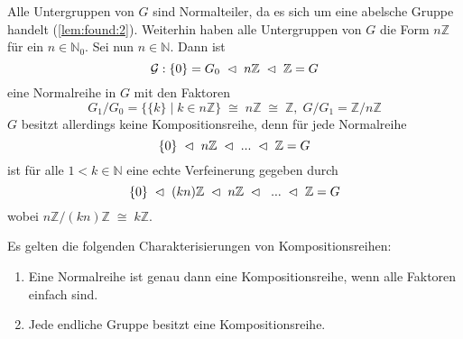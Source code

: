 \documentclass[../main.tex]{subfiles}
\begin{document}
\begin{example}[Kompositionsreihen von $(G := (\Z,+)$]
    Alle Untergruppen von $G$ sind Normalteiler, da es sich um eine abelsche Gruppe handelt (\cref{lem:found:2}). Weiterhin haben alle Untergruppen von $G$ die Form $n\mathbb{Z}$ für ein $n \in \mathbb{N}_0$.
    Sei nun $n \in \mathbb{N}$. Dann ist
    $$\mathcal{G}: \{0\} = G_0 \; \vartriangleleft \; n\mathbb{Z} \; \vartriangleleft \; \mathbb{Z} = G$$ eine Normalreihe in $G$ mit den Faktoren $$G_1/G_0 = \{\{k\} \mid k \in n\mathbb{Z}\} \; \cong \; n\mathbb{Z} \; \cong \; \mathbb{Z}, \; G/G_1 = \mathbb{Z}/n\mathbb{Z}$$
    $G$ besitzt allerdings keine Kompositionsreihe, denn für jede Normalreihe $$\{0\} \; \vartriangleleft \; n\mathbb{Z} \; \vartriangleleft \; ... \; \vartriangleleft \; \mathbb{Z} = G$$ ist für alle $1 < k \in \mathbb{N}$ eine echte Verfeinerung gegeben durch $$\{0\} \; \vartriangleleft \; (kn)\mathbb{Z} \; \vartriangleleft \; n\mathbb{Z} \; \vartriangleleft \; \; ... \; \vartriangleleft \; \mathbb{Z} = G$$
    wobei $n\mathbb{Z}/(kn)\mathbb{Z} \; \cong \; k\mathbb{Z}$.
\end{example}
\begin{theorem} \label{theo:1.6}
Es gelten die folgenden Charakterisierungen von Kompositionsreihen:
    \begin{enumerate}[label=(\alph*)]
        \item Eine Normalreihe ist genau dann eine Kompositionsreihe, wenn alle Faktoren einfach sind.
        \item Jede endliche Gruppe besitzt eine Kompositionsreihe.
    \end{enumerate}
\end{theorem}
\end{document}
